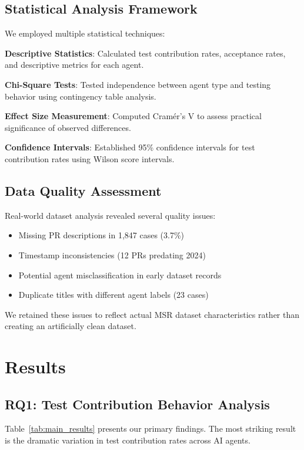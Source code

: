 \documentclass[conference]{IEEEtran}
\begin{document}
\subsection{Statistical Analysis Framework}

We employed multiple statistical techniques:

\textbf{Descriptive Statistics}: Calculated test contribution rates, acceptance rates, and descriptive metrics for each agent.

\textbf{Chi-Square Tests}: Tested independence between agent type and testing behavior using contingency table analysis.

\textbf{Effect Size Measurement}: Computed Cramér's V to assess practical significance of observed differences.

\textbf{Confidence Intervals}: Established 95\% confidence intervals for test contribution rates using Wilson score intervals.

\subsection{Data Quality Assessment}

Real-world dataset analysis revealed several quality issues:
\begin{itemize}
    \item Missing PR descriptions in 1,847 cases (3.7\%)
    \item Timestamp inconsistencies (12 PRs predating 2024)
    \item Potential agent misclassification in early dataset records
    \item Duplicate titles with different agent labels (23 cases)
\end{itemize}

We retained these issues to reflect actual MSR dataset characteristics rather than creating an artificially clean dataset.

\section{Results}

\subsection{RQ1: Test Contribution Behavior Analysis}

Table~\ref{tab:main_results} presents our primary findings. The most striking result is the dramatic variation in test contribution rates across AI agents.
\end{document}
